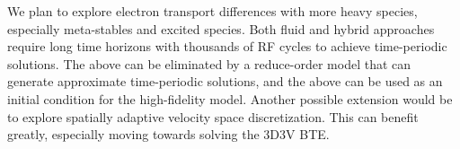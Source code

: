 We plan to explore electron transport differences with more heavy species, especially meta-stables and excited species. 
Both fluid and hybrid approaches require long time horizons with thousands of RF cycles to achieve time-periodic solutions. The above can be eliminated by a reduce-order model that can generate approximate time-periodic solutions, and the above can be used as an initial condition for the high-fidelity model. Another possible extension would be to explore spatially adaptive velocity space discretization. This can benefit greatly, especially moving towards solving the 3D3V BTE.